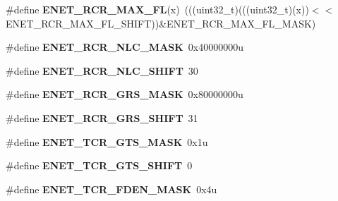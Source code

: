 \begin{DoxyCompactItemize}
\item 
\#define {\bfseries E\+N\+E\+T\+\_\+\+R\+C\+R\+\_\+\+M\+A\+X\+\_\+\+FL}(x)~(((uint32\+\_\+t)(((uint32\+\_\+t)(x))$<$$<$E\+N\+E\+T\+\_\+\+R\+C\+R\+\_\+\+M\+A\+X\+\_\+\+F\+L\+\_\+\+S\+H\+I\+FT))\&E\+N\+E\+T\+\_\+\+R\+C\+R\+\_\+\+M\+A\+X\+\_\+\+F\+L\+\_\+\+M\+A\+SK)\hypertarget{group__ENET__Register__Masks_gaec423542908c9af09d60a00a42243f02}{}\label{group__ENET__Register__Masks_gaec423542908c9af09d60a00a42243f02}

\item 
\#define {\bfseries E\+N\+E\+T\+\_\+\+R\+C\+R\+\_\+\+N\+L\+C\+\_\+\+M\+A\+SK}~0x40000000u\hypertarget{group__ENET__Register__Masks_ga2674365ca4dece5419e50ec62cfdd87c}{}\label{group__ENET__Register__Masks_ga2674365ca4dece5419e50ec62cfdd87c}

\item 
\#define {\bfseries E\+N\+E\+T\+\_\+\+R\+C\+R\+\_\+\+N\+L\+C\+\_\+\+S\+H\+I\+FT}~30\hypertarget{group__ENET__Register__Masks_gabd7c089e6785c4900d6fc5491db4f5ce}{}\label{group__ENET__Register__Masks_gabd7c089e6785c4900d6fc5491db4f5ce}

\item 
\#define {\bfseries E\+N\+E\+T\+\_\+\+R\+C\+R\+\_\+\+G\+R\+S\+\_\+\+M\+A\+SK}~0x80000000u\hypertarget{group__ENET__Register__Masks_ga01f144e600f9007df4d9cdc9d7f3879a}{}\label{group__ENET__Register__Masks_ga01f144e600f9007df4d9cdc9d7f3879a}

\item 
\#define {\bfseries E\+N\+E\+T\+\_\+\+R\+C\+R\+\_\+\+G\+R\+S\+\_\+\+S\+H\+I\+FT}~31\hypertarget{group__ENET__Register__Masks_ga6e192fa69584cca04e717c077d1bf702}{}\label{group__ENET__Register__Masks_ga6e192fa69584cca04e717c077d1bf702}

\item 
\#define {\bfseries E\+N\+E\+T\+\_\+\+T\+C\+R\+\_\+\+G\+T\+S\+\_\+\+M\+A\+SK}~0x1u\hypertarget{group__ENET__Register__Masks_ga99d109b14e8bda3be968900968045b8d}{}\label{group__ENET__Register__Masks_ga99d109b14e8bda3be968900968045b8d}

\item 
\#define {\bfseries E\+N\+E\+T\+\_\+\+T\+C\+R\+\_\+\+G\+T\+S\+\_\+\+S\+H\+I\+FT}~0\hypertarget{group__ENET__Register__Masks_ga6f1db14f8c66c67580cb518d13f99cc5}{}\label{group__ENET__Register__Masks_ga6f1db14f8c66c67580cb518d13f99cc5}

\item 
\#define {\bfseries E\+N\+E\+T\+\_\+\+T\+C\+R\+\_\+\+F\+D\+E\+N\+\_\+\+M\+A\+SK}~0x4u\hypertarget{group__ENET__Register__Masks_gadf5843a438d25920ade38488aa66a81c}{}\label{group__ENET__Register__Masks_gadf5843a438d25920ade38488aa66a81c}


\end{DoxyCompactItemize}
